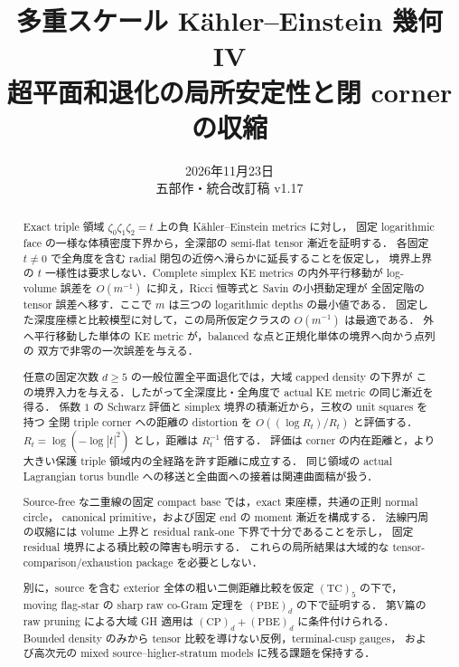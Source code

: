 \documentclass[a4paper,11pt]{ltjsarticle}
\title{\bfseries 多重スケール Kähler--Einstein 幾何 IV\\[1mm]
\large 超平面和退化の局所安定性と閉 corner の収縮}
\author{}
\date{2026年11月23日\\五部作・統合改訂稿 v1.17}
\numberwithin{equation}{section}
\theoremstyle{plain}
\theoremstyle{definition}
\theoremstyle{remark}
\begin{document}
\maketitle

\begin{abstract}
Exact triple 領域 $\zeta_0\zeta_1\zeta_2=t$ 上の負 Kähler--Einstein metrics に対し，
固定 logarithmic face の一様な体積密度下界から，全深部の semi-flat tensor 漸近を証明する．
各固定 $t\ne0$ で全角度を含む radial 閉包の近傍へ滑らかに延長することを仮定し，
境界上界の $t$ 一様性は要求しない．Complete simplex KE metrics の内外平行移動が
log-volume 誤差を $O(m^{-1})$ に抑え，Ricci 恒等式と Savin の小摂動定理が
全固定階の tensor 誤差へ移す．ここで $m$ は三つの logarithmic depths の最小値である．
固定した深度座標と比較模型に対して，この局所仮定クラスの $O(m^{-1})$ は最適である．
外へ平行移動した単体の KE metric が，balanced な点と正規化単体の境界へ向かう点列の
双方で非零の一次誤差を与える．

任意の固定次数 $d\ge5$ の一般位置全平面退化では，大域 capped density の下界が
この境界入力を与える．したがって全深度比・全角度で actual KE metric の同じ漸近を得る．
係数 $1$ の Schwarz 評価と simplex 境界の積漸近から，三枚の unit squares を持つ
全閉 triple corner への距離の distortion を $O((\log R_t)/R_t)$ と評価する．
$R_t=\log(-\log|t|^2)$ とし，距離は $R_t^{-1}$ 倍する．
評価は corner の内在距離と，より大きい保護 triple 領域内の全経路を許す距離に成立する．
同じ領域の actual Lagrangian torus bundle への移送と全曲面への接着は関連曲面稿が扱う．

Source-free な二重線の固定 compact base では，exact 束座標，共通の正則 normal circle，
canonical primitive，および固定 end の moment 漸近を構成する．
法線円周の収縮には volume 上界と residual rank-one 下界で十分であることを示し，
固定 residual 境界による積比較の障害も明示する．
これらの局所結果は大域的な tensor-comparison/exhaustion package を必要としない．

別に，source を含む exterior 全体の粗い二側距離比較を仮定 $\mathrm{(TC)}_5$ の下で，
moving flag-star の sharp raw co-Gram 定理を $\mathrm{(PBE)}_d$ の下で証明する．
第V篇の raw pruning による大域 GH 適用は $\mathrm{(CP)}_d+\mathrm{(PBE)}_d$ に条件付けられる．
Bounded density のみから tensor 比較を導けない反例，terminal-cusp gauges，
および高次元の mixed source--higher-stratum models に残る課題を保持する．
\end{abstract}
\end{document}
